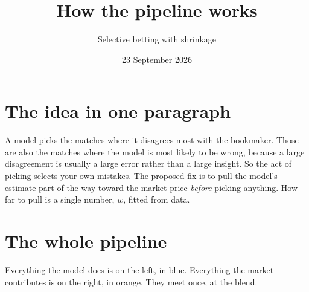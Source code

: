 \documentclass[11pt,a4paper]{article}
\title{\vspace{-1.5cm}How the pipeline works}
\author{Selective betting with shrinkage}
\date{23 September 2026}
\begin{document}
\maketitle
\vspace{-0.6cm}

\section*{The idea in one paragraph}

A model picks the matches where it disagrees most with the bookmaker. Those are
also the matches where the model is most likely to be wrong, because a large
disagreement is usually a large error rather than a large insight. So the act of
picking selects your own mistakes. The proposed fix is to pull the model's
estimate part of the way toward the market price \emph{before} picking anything.
How far to pull is a single number, $w$, fitted from data.

\section*{The whole pipeline}

Everything the model does is on the left, in blue. Everything the market
contributes is on the right, in orange. They meet once, at the blend.
\end{document}
